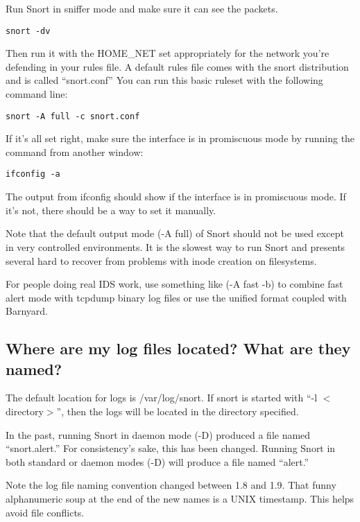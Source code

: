 \documentclass{article}
\begin{document}
Run Snort in sniffer mode and make sure it can see the packets.  

\begin{verbatim}snort -dv\end{verbatim}

Then run it with the HOME\_NET set appropriately for the network
you're defending in your rules file.  A default rules file comes with the
snort distribution and is called ``snort.conf'' You can run this basic ruleset
with the following command line:

\begin{verbatim}snort -A full -c snort.conf\end{verbatim}

If it's all set right, make sure the interface is in promiscuous mode by running the 
command from another window:

\begin{verbatim}ifconfig -a\end{verbatim}

The output from ifconfig should show if the interface is in promiscuous mode.  
If it's not, there should be a way to set it manually.

Note that the default output mode (-A full) of Snort should not be
used except in very controlled environments.  It is the slowest way
to run Snort and presents several hard to recover from problems
with inode creation on filesystems.

For people doing real IDS work, use something like (-A fast -b) to
combine fast alert mode with tcpdump binary log files or use the
unified format coupled with Barnyard.

\subsection{Where are my log files located?  What are they named?}

The default location for logs is /var/log/snort. If snort is started with ``-l
$<$directory$>$'', then the logs will be located in the directory specified.

In the past, running Snort in daemon mode (-D) produced a file named
``snort.alert.'' For consistency's sake, this has been changed. Running Snort in
both standard or daemon modes (-D) will produce a file named ``alert.''

Note the log file naming convention changed between 1.8 and 1.9. That funny
alphanumeric soup at the end of the new names is a UNIX timestamp. This helps
avoid file conflicts.
\end{document}
